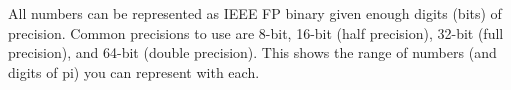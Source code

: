\documentclass[12pt]{article}
\begin{document}
All numbers can be represented as IEEE FP binary given enough digits (bits) of precision. Common precisions to use are 8-bit, 16-bit (half precision), 32-bit (full precision), and 64-bit (double precision). This shows the range of numbers (and digits of pi) you can represent with each.
\begin{table}[h]
    \centering
    \caption{Common IEEE Floating-Point Precisions and Approximations of Pi}
\end{table}
\end{document}
